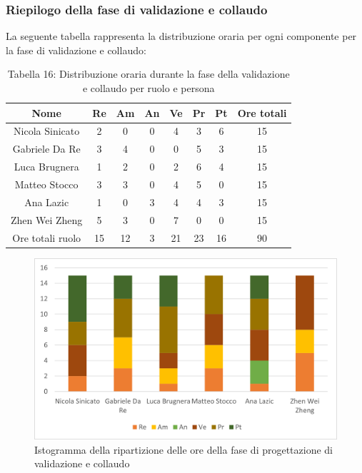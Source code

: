 \subsubsection{Riepilogo della fase di validazione e collaudo }
%
La seguente tabella rappresenta la distribuzione oraria per ogni componente per la fase di validazione e collaudo:
\begin{table}[h]
	\setlength\extrarowheight{5pt}
	\centering
	\begin{tabularx}{\textwidth}{|ccccccc|c|}
		\hline
		\rowcolor{white}
		\textbf{Nome} & \textbf{Re} & \textbf{Am} & \textbf{An} & \textbf{Ve} & \textbf{Pr}& \textbf{Pt} & \textbf{Ore totali} \\
		\hline
		Nicola Sinicato &2&0&0&4&3&6&15 \\
		Gabriele Da Re &3&4&0&0&5&3&15 \\
		Luca Brugnera &1&2&0&2&6&4&15 \\
		Matteo Stocco &3&3&0&4&5&0&15 \\
		Ana Lazic &1&0&3&4&4&3&15 \\
		Zhen Wei Zheng &5&3&0&7&0&0&15 \\
		\hline
		Ore totali ruolo &15&12&3&21&23&16&90 \\
		\hline
	\end{tabularx}
	\vspace{10pt}
	\caption{Tabella 16: Distribuzione oraria durante la fase della validazione e collaudo per ruolo e persona}
\end{table}
\begin{figure}[H]
    \centering
    \includegraphics[scale=0.6]{img/grafi preventivo/istogrammi/validazione/complessivo.png}
    \caption{Istogramma della ripartizione delle ore della fase di progettazione di validazione e collaudo}
\end{figure}
